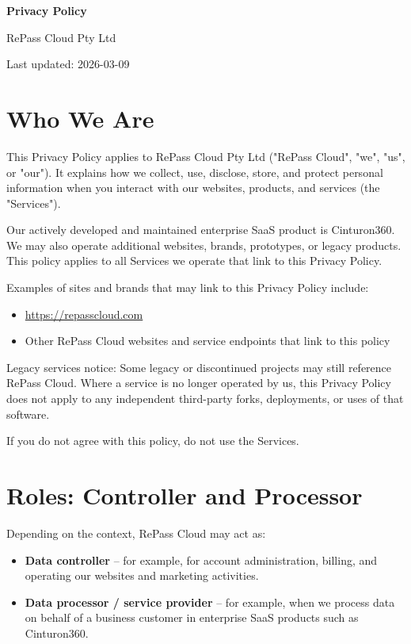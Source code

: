 \documentclass[11pt]{article}
\begin{document}
{\LARGE \textbf{Privacy Policy}}

\vspace{4pt}
RePass Cloud Pty Ltd

\vspace{2pt}
Last updated: 2026-03-09

\vspace{12pt}

\section{Who We Are}

This Privacy Policy applies to RePass Cloud Pty Ltd ("RePass Cloud", "we", "us", or "our"). It explains how we collect, use, disclose, store, and protect personal information when you interact with our websites, products, and services (the "Services").

Our actively developed and maintained enterprise SaaS product is Cinturon360. We may also operate additional websites, brands, prototypes, or legacy products. This policy applies to all Services we operate that link to this Privacy Policy.

Examples of sites and brands that may link to this Privacy Policy include:

\begin{itemize}
\item \url{https://repasscloud.com}
\item Other RePass Cloud websites and service endpoints that link to this policy
\end{itemize}

Legacy services notice: Some legacy or discontinued projects may still reference RePass Cloud. Where a service is no longer operated by us, this Privacy Policy does not apply to any independent third-party forks, deployments, or uses of that software.

If you do not agree with this policy, do not use the Services.

\section{Roles: Controller and Processor}

Depending on the context, RePass Cloud may act as:

\begin{itemize}
\item \textbf{Data controller} -- for example, for account administration, billing, and operating our websites and marketing activities.
\item \textbf{Data processor / service provider} -- for example, when we process data on behalf of a business customer in enterprise SaaS products such as Cinturon360.
\end{itemize}
\end{document}
